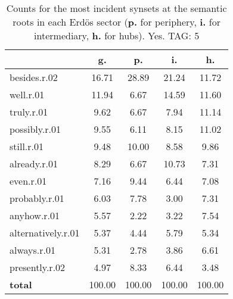 \begin{table}[h!]
\begin{center}
\begin{tabular}{| l | c | c | c | c |}\hline
 & g. & p. & i. & h. \\\hline
besides.r.02 & 16.71  & 28.89  & 21.24  & 11.72 \\\hline
well.r.01 & 11.94  & 6.67  & 14.59  & 11.60 \\\hline
truly.r.01 & 9.62  & 6.67  & 7.94  & 11.14 \\\hline
possibly.r.01 & 9.55  & 6.11  & 8.15  & 11.02 \\\hline
still.r.01 & 9.48  & 10.00  & 8.58  & 9.86 \\\hline
already.r.01 & 8.29  & 6.67  & 10.73  & 7.31 \\\hline
even.r.01 & 7.16  & 9.44  & 6.44  & 7.08 \\\hline
probably.r.01 & 6.03  & 7.78  & 3.00  & 7.31 \\\hline
anyhow.r.01 & 5.57  & 2.22  & 3.22  & 7.54 \\\hline
alternatively.r.01 & 5.37  & 4.44  & 5.79  & 5.34 \\\hline
always.r.01 & 5.31  & 2.78  & 3.86  & 6.61 \\\hline
presently.r.02 & 4.97  & 8.33  & 6.44  & 3.48 \\\hline
{{\bf total}} & 100.00  & 100.00  & 100.00  & 100.00 \\\hline
\end{tabular}
\caption{Counts for the most incident synsets at the semantic roots in each Erd\"os sector ({\bf p.} for periphery, {\bf i.} for intermediary, {\bf h.} for hubs). Yes. TAG: 5}
\end{center}
\end{table}